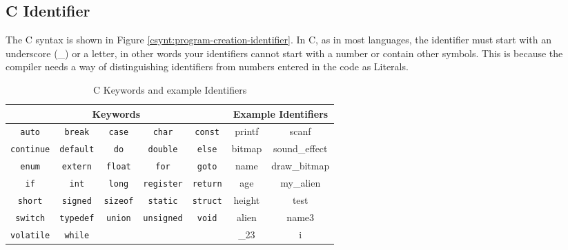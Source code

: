 \clearpage
\subsection{C Identifier} %
\label{sub:c_identifier}

The C  syntax is shown in Figure \ref{csynt:program-creation-identifier}. In C, as in most languages, the identifier must start with an underscore (\_) or a letter, in other words your identifiers cannot start with a number or contain other symbols. This is because the compiler needs a way of distinguishing identifiers from numbers entered in the code as Literals.


\begin{table}[h]
  \centering
  \begin{tabular}{|ccccc||cc|}
    \hline
    \multicolumn{5}{|c||}{\textbf{Keywords}} & \multicolumn{2}{c|}{\textbf{Example Identifiers}} \\
    \hline
    \texttt{auto}     &   \texttt{break}    & \texttt{case}     &   \texttt{char}     &   \texttt{const}   & printf & scanf  \\         
    \texttt{continue} &   \texttt{default}  &  \texttt{do}      &   \texttt{double}   &   \texttt{else}    & bitmap & sound\_effect  \\
    \texttt{enum}     &   \texttt{extern}   & \texttt{float}    &   \texttt{for}      &   \texttt{goto}    & name & draw\_bitmap  \\
    \texttt{if}       &   \texttt{int}      &   \texttt{long}   &   \texttt{register} &   \texttt{return}  & age & my\_alien \\         
    \texttt{short}    &   \texttt{signed}   & \texttt{sizeof}   &   \texttt{static}   &   \texttt{struct}  & height & test  \\          
    \texttt{switch}   & \texttt{typedef}  &   \texttt{union}    &   \texttt{unsigned} &   \texttt{void}    & alien & name3 \\
    \texttt{volatile} &   \texttt{while}    &  & &                                                         & \_23  & i \\
    \hline
  \end{tabular}
  \caption{C Keywords and example Identifiers}
  \label{tbl:program-creation-c identifiers and keywords}
\end{table}












